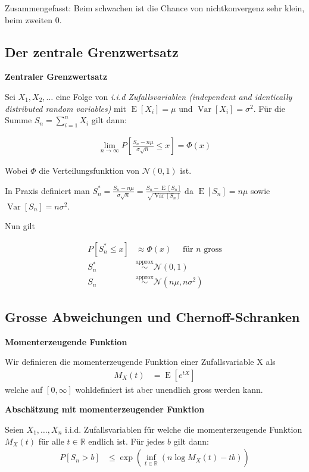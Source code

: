 \documentclass[25pt]{sciposter}
\newcommand{\R}{\mathbb{R}}
\newcommand{\Var}{\operatorname{Var}}
\newcommand{\E}{\operatorname{E}}
\newenvironment{method}[1]{\begin{mdframed}[backgroundcolor=blue!10,innertopmargin=15pt, innerbottommargin=15pt,nobreak=true]
		\textbf{#1 }
	}
	{ 
	\end{mdframed}
}
\begin{document}
\begin{multicols}{3}
Zusammengefasst: Beim schwachen ist die Chance von nichtkonvergenz sehr klein, beim zweiten 0.

\subsection*{Der zentrale Grenzwertsatz}


\begin{method}{Zentraler Grenzwertsatz}
	Sei $X_1,X_2,\ldots$ eine Folge von \textit{i.i.d Zufallsvariablen (independent and identically distributed random variables)} mit $\E[X_i] = \mu$ und $\Var[X_i] = \sigma^2$. Für die Summe $S_n = \sum_{i=1}^{n} X_i$ gilt dann:
	
	\begin{align*}
		\lim\limits_{n \to \infty} P\left[ \frac{S_n - n\mu}{\sigma \sqrt{n}} \leq x\right] = \Phi(x)
	\end{align*}

	Wobei $\Phi$ die Verteilungsfunktion von $\mathcal{N}(0,1)$ ist.	
\end{method}

In Praxis definiert man $S_n^* = \frac{S_n- n\mu}{\sigma \sqrt{n}} = \frac{S_n-\E[S_n]}{\sqrt{\Var[S_n]}}$ da $\E[S_n] = n\mu$ sowie $\Var[S_n] = n\sigma^2$.

Nun gilt

\begin{align*}
	P[S_n^*\leq x] &\approx \Phi(x) \quad \text{ für $n$ gross}\\
	S_n^* &\stackrel{\text{approx}}{\sim} \mathcal{N}(0,1)\\
	S_n &\stackrel{\text{approx}}{\sim} \mathcal{N}(n\mu, n\sigma^2)
\end{align*}

\subsection*{Grosse Abweichungen und Chernoff-Schranken}


\begin{method}{Momenterzeugende Funktion}
	Wir definieren die momenterzeugende Funktion einer Zufallsvariable X als
	\begin{align*}
		M_X(t) &= \E\left[e^{tX}\right]
	\end{align*}
	welche auf $[0,\infty]$ wohldefiniert ist aber unendlich gross werden kann.
\end{method}

\begin{method}{Abschätzung mit momenterzeugender Funktion}
Seien $X_1,\ldots,X_n$ i.i.d. Zufallsvariablen für welche die momenterzeugende Funktion $M_X(t)$ für alle $t\in \R$ endlich ist. Für jedes $b$ gilt dann:
\begin{align*}
	P[S_n > b] &\leq \exp \left( \inf_{t\in\R} \left(  n\log M_X(t) - tb \right)  \right)
\end{align*}
\end{method}



\end{multicols}
\end{document}
